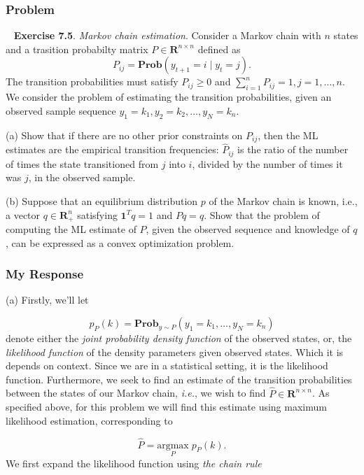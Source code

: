 \documentclass[12pt,reqno]{article}
\theoremstyle{definition}
\numberwithin{equation}{section}
\begin{document}
\subsubsection*{Problem}
~\cite{boyd_convex_optimization} \textbf{Exercise 7.5}. \textit{Markov chain estimation}. Consider a Markov chain
with $n$ states and a trasition probabilty matrix $P \in \mathbf{R}^{n \times n}$ defined as
\[P_{ij} = \mathbf{Prob}\left(y_{t+1} = i \mid y_t = j\right).\]
The transition probabilities must satisfy $P_{i j} \geq 0$ and $\sum_{i=1}^n P_{i j}=1, j=1, \ldots, n$. We consider the problem of estimating the transition probabilities,
given an observed sample sequence $y_1=k_1, y_2=k_2, \ldots, y_N=k_n$.

\vspace{0.1cm}
\noindent (a) Show that if there are no other prior constraints on $P_{i j}$, then the ML estimates are the empirical transition frequencies:
$\hat{P}_{i j}$ is the ratio of the number of times the state transitioned from $j$ into $i$, divided by the number of times it was $j$, in the observed sample.

\vspace{0.1cm}
\noindent (b) Suppose that an equilibrium distribution $p$ of the Markov chain is known, i.e., a vector $q \in \mathbf{R}_{+}^n$ satisfying $\mathbf{1}^T q=1$ and $P q=q$. Show that the problem of computing the ML estimate of $P$,
given the observed sequence and knowledge of $q$, can be expressed as a convex optimization problem.

\subsubsection*{My Response}
\noindent (a) Firstly, we'll let

\[p_{P}(k) = \mathbf{Prob}_{y \sim P}\left(y_1 = k_1, \ldots, y_N = k_n\right)\]
denote either the \textit{joint probability density function} of the observed states, or,
the \textit{likelihood function} of the density parameters given observed states. Which it is depends on context.
Since we are in a statistical setting, it is the likelihood function. Furthermore, we seek to find an estimate
of the transition probabilities between the states of our Markov chain, \textit{i.e.}, we wish to find $\hat{P} \in \mathbf{R}^{n \times n}$.
As specified above, for this problem we will find this estimate using maximum likelihood estimation, corresponding to 

\[\hat{P} = \underset{P}{\mathrm{argmax}} \; p_P(k). \]
We first expand the likelihood function using \textit{the chain rule}
\end{document}
